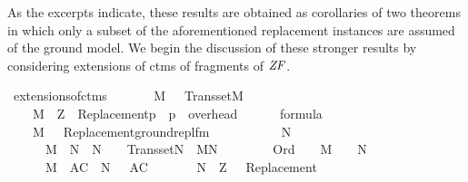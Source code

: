 As the excerpts indicate, these results are obtained as corollaries of
two theorems in which only a subset of the aforementioned
replacement instances are assumed of the ground model. We begin the
discussion of these stronger results by
considering extensions of ctms of fragments of $\mathit{ZF}$.
\begin{isabelle}
\isamarkupfalse%
\ extensions{\isacharunderscore}{\kern0pt}of{\isacharunderscore}{\kern0pt}ctms{\isacharcolon}{\kern0pt}\isanewline
\ \ \isanewline
\ \ \ \ {\isachardoublequoteopen}M\ {\isasymapprox}\ {\isasymomega}{\isachardoublequoteclose}\ {\isachardoublequoteopen}Transset{\isacharparenleft}{\kern0pt}M{\isacharparenright}{\kern0pt}{\isachardoublequoteclose}\isanewline
\ \ \ \ {\isachardoublequoteopen}M\ {\isasymTurnstile}\ {\isasymcdot}Z{\isasymcdot}\ {\isasymunion}\ {\isacharbraceleft}{\kern0pt}{\isasymcdot}Replacement{\isacharparenleft}{\kern0pt}p{\isacharparenright}{\kern0pt}{\isasymcdot}\ {\isachardot}{\kern0pt}\ p\ {\isasymin}\ overhead{\isacharbraceright}{\kern0pt}{\isachardoublequoteclose}\isanewline
\ \ \ \ {\isachardoublequoteopen}{\isasymPhi}\ {\isasymsubseteq}\ formula{\isachardoublequoteclose}\isanewline%
\ \ \ \ {\isachardoublequoteopen}M\ {\isasymTurnstile}\ {\isacharbraceleft}{\kern0pt}\ {\isasymcdot}Replacement{\isacharparenleft}{\kern0pt}ground{\isacharunderscore}{\kern0pt}repl{\isacharunderscore}{\kern0pt}fm{\isacharparenleft}{\kern0pt}{\isasymphi}{\isacharparenright}{\kern0pt}{\isacharparenright}{\kern0pt}{\isasymcdot}\ {\isachardot}{\kern0pt}\ {\isasymphi}\ {\isasymin}\ {\isasymPhi}{\isacharbraceright}{\kern0pt}{\isachardoublequoteclose}\isanewline
\ \ \isanewline
\ \ \ \ {\isachardoublequoteopen}{\isasymexists}N{\isachardot}{\kern0pt}\isanewline
\ \ \ \ \ \ M\ {\isasymsubseteq}\ N\ {\isasymand}\ N\ {\isasymapprox}\ {\isasymomega}\ {\isasymand}\ Transset{\isacharparenleft}{\kern0pt}N{\isacharparenright}{\kern0pt}\ {\isasymand}\ M{\isasymnoteq}N\ {\isasymand}\isanewline
\ \ \ \ \ \ {\isacharparenleft}{\kern0pt}{\isasymforall}{\isasymalpha}{\isachardot}{\kern0pt}\ Ord{\isacharparenleft}{\kern0pt}{\isasymalpha}{\isacharparenright}{\kern0pt}\ {\isasymlongrightarrow}\ {\isacharparenleft}{\kern0pt}{\isasymalpha}\ {\isasymin}\ M\ {\isasymlongleftrightarrow}\ {\isasymalpha}\ {\isasymin}\ N{\isacharparenright}{\kern0pt}{\isacharparenright}{\kern0pt}\ {\isasymand}\isanewline
\ \ \ \ \ \ {\isacharparenleft}{\kern0pt}{\isacharparenleft}{\kern0pt}M{\isacharcomma}{\kern0pt}\ {\isacharbrackleft}{\kern0pt}{\isacharbrackright}{\kern0pt}{\isasymTurnstile}\ {\isasymcdot}AC{\isasymcdot}{\isacharparenright}{\kern0pt}\ {\isasymlongrightarrow}\ N{\isacharcomma}{\kern0pt}\ {\isacharbrackleft}{\kern0pt}{\isacharbrackright}{\kern0pt}\ {\isasymTurnstile}\ {\isasymcdot}AC{\isasymcdot}{\isacharparenright}{\kern0pt}\ {\isasymand}\isanewline
\ \ \ \ \ \ N\ {\isasymTurnstile}\ {\isasymcdot}Z{\isasymcdot}\ {\isasymunion}\ {\isacharbraceleft}{\kern0pt}\ {\isasymcdot}Replacement{\isacharparenleft}{\kern0pt}{\isasymphi}{\isacharparenright}{\kern0pt}{\isasymcdot}\ {\isachardot}{\kern0pt}\ {\isasymphi}\ {\isasymin}\ {\isasymPhi}{\isacharbraceright}{\kern0pt}{\isachardoublequoteclose}
\end{isabelle}

